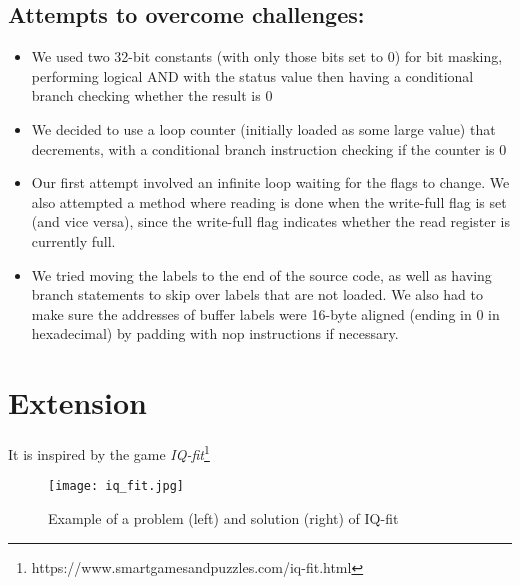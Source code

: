 \documentclass{article}
\begin{document}
\subsection{Attempts to overcome challenges:}

\begin{itemize}
    \item We used two 32-bit constants (with only those bits set to 0) for bit masking, performing logical AND with the status value then having a conditional branch checking whether the result is 0 
    \item We decided to use a loop counter (initially loaded as some large value) that decrements, with a conditional branch instruction checking if the counter is 0
    \item Our first attempt involved an infinite loop waiting for the flags to change. We also attempted a method where reading is done when the write-full flag is set (and vice versa), since the write-full flag indicates whether the read register is currently full.
    \item We tried moving the labels to the end of the source code, as well as having branch statements to skip over labels that are not loaded. We also had to make sure the addresses of buffer labels were 16-byte aligned (ending in 0 in hexadecimal) by padding with nop instructions if necessary.
\end{itemize}

\vspace{20pt}

\section{Extension}

It is inspired by the game \emph{IQ-fit}\footnote{https://www.smartgamesandpuzzles.com/iq-fit.html}

\begin{figure}[h]
    \centering
    \texttt{[image: iq\_fit.jpg]}
    \caption{Example of a problem (left) and solution (right) of IQ-fit}
    \label{fig:image 2}
\end{figure}
\end{document}

